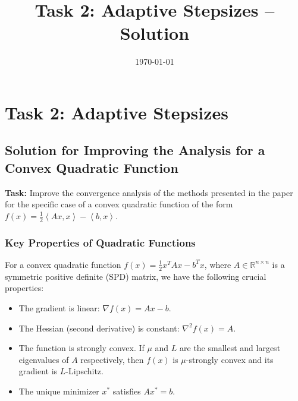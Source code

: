 \documentclass[11pt,a4paper,reqno]{article}
\title{Task 2: Adaptive Stepsizes -- Solution}
\author{} %
\date{\today}
\newcommand{\R}{\mathbb{R}}
\newcommand{\lr}[1]{\left\langle #1\right\rangle}
\begin{document}
\maketitle

\section{Task 2: Adaptive Stepsizes} %

\subsection{Solution for Improving the Analysis for a Convex Quadratic Function}
\label{sec:quadratic_improvement_solution}

\textbf{Task:} Improve the convergence analysis of the methods presented in the paper for the specific case of a convex quadratic function of the form $f(x) = \frac 12 \lr{Ax,x} - \lr{b,x}$.

\subsubsection{Key Properties of Quadratic Functions}
For a convex quadratic function $f(x) = \frac 12 x^T A x - b^T x$, where $A \in \R^{n \times n}$ is a symmetric positive definite (SPD) matrix, we have the following crucial properties:
\begin{itemize}
    \item The gradient is linear: $\nabla f(x) = Ax - b$.
    \item The Hessian (second derivative) is constant: $\nabla^2 f(x) = A$.
    \item The function is strongly convex. If $\mu$ and $L$ are the smallest and largest eigenvalues of $A$ respectively, then $f(x)$ is $\mu$-strongly convex and its gradient is $L$-Lipschitz.
    \item The unique minimizer $x^*$ satisfies $Ax^*=b$.
\end{itemize}
\end{document}
